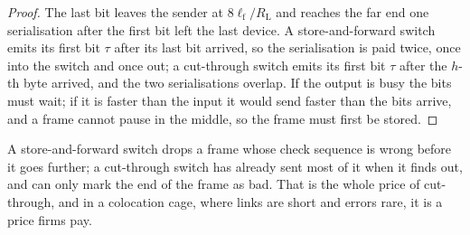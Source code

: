\begin{proof}
The last bit leaves the sender at $8\ell_{\mathrm f}/R_{\mathrm L}$ and reaches the far end one serialisation after the first
bit left the last device. A store-and-forward switch emits its first bit $\tau$ after its last bit arrived, so the serialisation
is paid twice, once into the switch and once out; a cut-through switch emits its first bit $\tau$ after the $h$-th byte arrived,
and the two serialisations overlap. If the output is busy the bits must wait; if it is faster than the input it would send
faster than the bits arrive, and a frame cannot pause in the middle, so the frame must first be stored.
\end{proof}

\begin{omfigure}

\label{fig:nw:switches-and-layer-1-devices:modes}
\end{omfigure}

A store-and-forward switch drops a frame whose check sequence is wrong before it goes further; a cut-through switch has already
sent most of it when it finds out, and can only mark the end of the frame as bad. That is the whole price of cut-through, and
in a colocation cage, where links are short and errors rare, it is a price firms pay.

